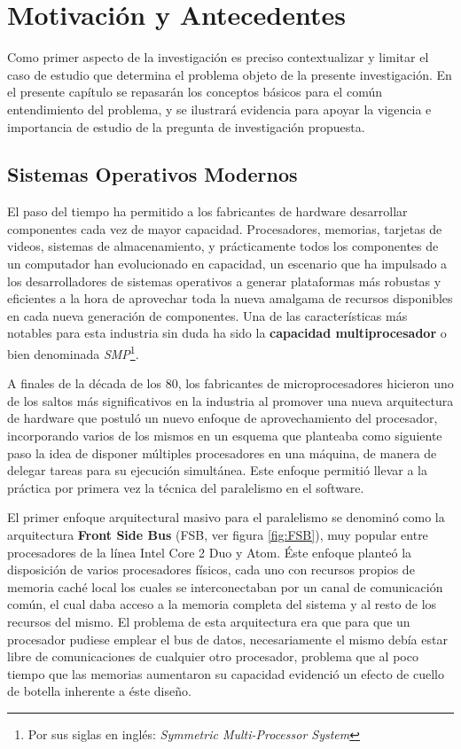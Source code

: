 \chapter{Motivación y Antecedentes}

Como primer aspecto de la investigación es preciso contextualizar y limitar el caso de estudio que determina el problema objeto de la presente investigación. En el presente capítulo se repasarán los conceptos básicos para el común entendimiento del problema, y se ilustrará evidencia para apoyar la vigencia e importancia de estudio de la pregunta de investigación propuesta.

\section{Sistemas Operativos Modernos}
El paso del tiempo ha permitido a los fabricantes de hardware desarrollar componentes cada vez de mayor capacidad. Procesadores, memorias, tarjetas de videos, sistemas de almacenamiento, y prácticamente todos los componentes de un computador han evolucionado en capacidad, un escenario que ha impulsado a los desarrolladores de sistemas operativos a generar plataformas más robustas y eficientes a la hora de aprovechar toda la nueva amalgama de recursos disponibles en cada nueva generación de componentes. Una de las características más notables para esta industria sin duda ha sido la \textbf{capacidad multiprocesador} o bien denominada \emph{SMP}\footnote{Por sus siglas en inglés: \textit{Symmetric Multi-Processor System}}.

A finales de la década de los 80, los fabricantes de microprocesadores hicieron uno de los saltos más significativos en la industria al promover una nueva arquitectura de hardware que postuló un nuevo enfoque de aprovechamiento del procesador, incorporando varios de los mismos en un esquema que planteaba como siguiente paso la idea de disponer múltiples procesadores en una máquina, de manera de delegar tareas para su ejecución simultánea. Este enfoque permitió llevar a la práctica por primera vez la técnica del paralelismo en el software.

El primer enfoque arquitectural masivo para el paralelismo se denominó como la arquitectura \textbf{Front Side Bus} (FSB, ver figura \ref{fig:FSB}), muy popular entre procesadores de la línea Intel Core 2 Duo y Atom. Éste enfoque planteó la disposición de varios procesadores físicos, cada uno con recursos propios de memoria caché local los cuales se interconectaban por un canal de comunicación común, el cual daba acceso a la memoria completa del sistema y al resto de los recursos del mismo. El problema de esta arquitectura era que para que un procesador pudiese emplear el bus de datos, necesariamente el mismo debía estar libre de comunicaciones de cualquier otro procesador, problema que al poco tiempo que las memorias aumentaron su capacidad evidenció un efecto de cuello de botella inherente a éste diseño.


